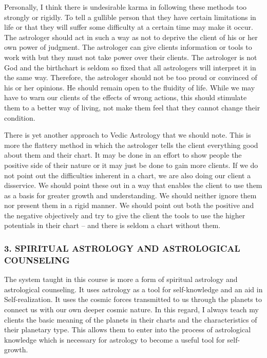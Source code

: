  

Personally, I think there is undesirable karma in following these methods too strongly or rigidly. To tell a gullible person that they have certain limitations in life or that they will suffer some difficulty at a certain time may make it occur. The astrologer should act in such a way as not to deprive the client of his or her own power of judgment. The astrologer can give clients information or tools to work with but they must not take power over their clients. The astrologer is not God and the birthchart is seldom so fixed that all astrologers will interpret it in the same way. Therefore, the astrologer should not be too proud or convinced of his or her opinions. He should remain open to the fluidity of life. While we may have to warn our clients of the effects of wrong actions, this should stimulate them to a better way of living, not make them feel that they cannot change their condition.

 

There is yet another approach to Vedic Astrology that we should note. This is more the flattery method in which the astrologer tells the client everything good about them and their chart. It may be done in an effort to show people the positive side of their nature or it may just be done to gain more clients. If we do not point out the difficulties inherent in a chart, we are also doing our client a disservice. We should point these out in a way that enables the client to use them as a basis for greater growth and understanding. We should neither ignore them nor present them in a rigid manner. We should point out both the positive and the negative objectively and try to give the client the tools to use the higher potentials in their chart – and there is seldom a chart without them.

 

\subsubsection{3. SPIRITUAL ASTROLOGY AND ASTROLOGICAL COUNSELING}
 

The system taught in this course is more a form of spiritual astrology and astrological counseling. It uses astrology as a tool for self-knowledge and an aid in Self-realization. It uses the cosmic forces transmitted to us through the planets to connect us with our own deeper cosmic nature. In this regard, I always teach my clients the basic meaning of the planets in their charts and the characteristics of their planetary type. This allows them to enter into the process of astrological knowledge which is necessary for astrology to become a useful tool for self-growth.

